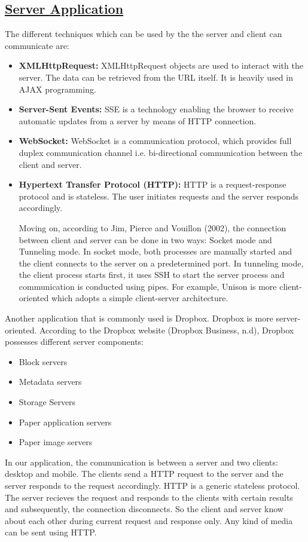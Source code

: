 \documentclass{article}
\begin{document}
\subsection{\underline{Server Application}}
The different techniques which can be used by the the server and client can communicate are:
\begin{itemize}
\item \textbf{XMLHttpRequest:} XMLHttpRequest objects are used to interact with the server. The data can be retrieved from the URL itself. It is heavily used in AJAX programming.
\item \textbf{Server-Sent Events:} SSE is a technology enabling the browser to receive automatic updates from a server by means of HTTP connection.
\item \textbf{WebSocket:} WebSocket is a communication protocol, which provides full duplex communication channel i.e. bi-directional communication between the client and server.
\item \textbf{Hypertext Transfer Protocol (HTTP):} HTTP is a request-response protocol and is stateless. The user initiates requests and the server responds accordingly.

Moving on, according to Jim, Pierce and Vouillon (2002), the connection between client and server can be done in two ways: Socket mode and Tunneling mode. In socket mode, both processes are manually started and the client connects to the server on a predetermined port. In tunneling mode, the client process starts first, it uses SSH to start the server process and communication is conducted using pipes. For example, Unison is more client-oriented which adopts a simple client-server architecture.
\end{itemize}

Another application that is commonly used is Dropbox. Dropbox is more server-oriented. According to the Dropbox website (Dropbox Business, n.d), Dropbox possesses different server components:
\begin{itemize}
\item Block servers
\item Metadata servers
\item Storage Servers
\item Paper application servers
\item Paper image servers
\end{itemize}

In our application, the communication is between a server and two clients: desktop and mobile. The clients send a HTTP request to the server and the server responds to the request accordingly. HTTP is a generic stateless protocol. The server recieves the request and responds to the clients with certain results and subsequently, the connection disconnects. So the client and server know about each other during current request and response only. Any kind of media can be sent using HTTP.
\end{document}
